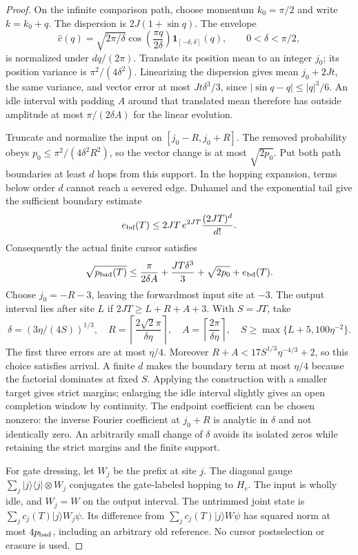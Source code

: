 \documentclass[12pt]{article}
\theoremstyle{definition}
\theoremstyle{remark}
\begin{document}
\begin{proof}
On the infinite comparison path, choose momentum $k_0=\pi/2$ and
write $k=k_0+q$. The dispersion is $2J(1+\sin q)$. The envelope
\[
 \widehat c(q)=\sqrt{2\pi/\delta}
 \cos\!\left(\frac{\pi q}{2\delta}\right)
 \mathbf1_{[-\delta,\delta]}(q),\qquad0<\delta<\pi/2,
\]
is normalized under $dq/(2\pi)$. Translate its position mean to an
integer $j_0$; its position variance is $\pi^2/(4\delta^2)$.
Linearizing the dispersion gives mean $j_0+2Jt$, the same variance,
and vector error at most $Jt\delta^3/3$, since
$|\sin q-q|\le|q|^3/6$. An idle interval with padding $A$ around
that translated mean therefore has outside amplitude at most
$\pi/(2\delta A)$ for the linear evolution.

Truncate and normalize the input on $[j_0-R,j_0+R]$. The removed
probability obeys $p_0\le\pi^2/(4\delta^2R^2)$, so the vector
change is at most $\sqrt{2p_0}$. Put both path boundaries at least
$d$ hops from this support. In the hopping expansion, terms below
order $d$ cannot reach a severed edge. Duhamel and the exponential
tail give the sufficient boundary estimate
\[
 e_{\rm bd}(T)\le2JT\,e^{2JT}\frac{(2JT)^d}{d!}.
\]
Consequently the actual finite cursor satisfies
\[
 \sqrt{p_{\rm bad}(T)}\le
 \frac{\pi}{2\delta A}+\frac{JT\delta^3}{3}
 +\sqrt{2p_0}+e_{\rm bd}(T).
\]
Choose $j_0=-R-3$, leaving the forwardmost input site at $-3$.
The output interval lies after site $L$ if
$2JT\ge L+R+A+3$. With $S=JT$, take
\[
 \delta=(3\eta/(4S))^{1/3},\quad
 R=\left\lceil\frac{2\sqrt2\pi}{\delta\eta}\right\rceil,
 \quad A=\left\lceil\frac{2\pi}{\delta\eta}\right\rceil,
 \quad S\ge\max\{L+5,100\eta^{-2}\}.
\]
The first three errors are at most $\eta/4$. Moreover
$R+A<17S^{1/3}\eta^{-4/3}+2$, so this choice satisfies arrival.
A finite $d$ makes the boundary term at most $\eta/4$ because
the factorial dominates at fixed $S$. Applying the construction
with a smaller target gives strict margins; enlarging the idle
interval slightly gives an open completion window by continuity.
The endpoint coefficient can be chosen nonzero: the inverse Fourier
coefficient at $j_0+R$ is analytic in $\delta$ and not identically
zero. An arbitrarily small change of $\delta$ avoids its isolated
zeros while retaining the strict margins and the finite support.

For gate dressing, let $W_j$ be the prefix at site $j$.
The diagonal gauge $\sum_j|j\rangle\langle j|\otimes W_j$
conjugates the gate-labeled hopping to $H_c$. The input is wholly
idle, and $W_j=W$ on the output interval. The untrimmed joint state
is $\sum_jc_j(T)|j\rangle W_j\psi$. Its difference from
$\sum_jc_j(T)|j\rangle W\psi$ has squared norm at most
$4p_{\rm bad}$, including an arbitrary old reference. No cursor
postselection or erasure is used.
\end{proof}
\end{document}
